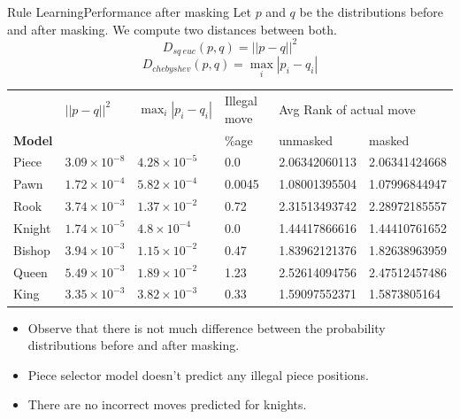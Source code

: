 \documentclass[9pt, unknownkeysallowed]{beamer}
\begin{document}
\begin{frame}{Rule Learning}{Performance after masking}
 {\tiny
Let $p$ and $q$ be the distributions before and after masking. We compute two 
distances between both.
\[D_{sq\ euc}(p,q) = ||p-q||^2\]
\[D_{chebyshev}(p,q) = \max_{i}|p_i-q_i|\]
}
\begin{table}
\tiny
\begin{tabular}{@{}llllll@{}}
\toprule
{\bf } & $||p-q||^2$ & $\max_i |p_i-q_i|$& Illegal move& 
\multicolumn{2}{l}{Avg Rank of actual move} \\ \cmidrule(l){5-6} 
{\bf Model}           &        &             &\%age                        & 
unmasked          & masked          \\ \midrule
{\sc Piece}  &     $3.09\times 10^{-8}$ & $4.28\times 10^{-5}$                 
    & 0.0 &2.06342060113 &2.06341424668                   
\\
{\sc Pawn}   &     $1.72\times 10^{-4}$               & $5.82\times 10^{-4}$    
                  & 0.0045 &       1.08001395504 &1.07996844947             
\\
{\sc Rook}   &             $3.74\times 10^{-3}$& $1.37\times 10^{-2}$           
 &   0.72       &2.31513493742 &2.28972185557           
\\
{\sc Knight} &       $1.74\times 10^{-5}$             &     $4.8\times 
10^{-4}$                  &       0.0 & 1.44417866616 &1.44410761652            
  
\\
{\sc Bishop}  &    $3.94\times 10^{-3}$                &  $1.15\times 10^{-2}$  
 
& 0.47                 &  1.83962121376 & 1.82638963959         
\\
{\sc Queen}  &     $5.49\times 10^{-3}$               & $1.89\times 10^{-2}$ &  
   1.23                &                   2.52614094756 &2.47512457486  
\\
{\sc King}   &    $3.35\times 10^{-3}$                &   $3.82\times 10^{-3}$ 
&       0.33            &      1.59097552371 & 1.5873805164        
\\ \bottomrule
\end{tabular}
\end{table}

 \begin{itemize}
  \item Observe that there is not much difference between the probability 
distributions before and after masking.	
  \item Piece selector model doesn't predict any illegal piece positions.
  \item There are no incorrect moves predicted for knights.
 \end{itemize}

\end{frame}
\end{document}
